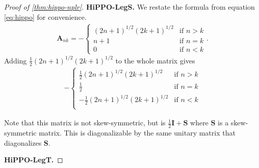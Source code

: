 \begin{proof}[Proof of \cref{thm:hippo-nplr}]
  \textbf{HiPPO-LegS.}
  We restate the formula from equation \eqref{eq:hippo} for convenience.
  \begin{align*}
    \bm{A}_{nk}
    =
    -
    \begin{cases}
      (2n+1)^{1/2}(2k+1)^{1/2} & \mbox{if } n > k \\
      n+1                      & \mbox{if } n = k \\
      0                        & \mbox{if } n < k
    \end{cases}
    .
  \end{align*}
  Adding \( \frac{1}{2}(2n+1)^{1/2}(2k+1)^{1/2} \) to the whole matrix gives
  \begin{align*}
    -
    \begin{cases}
      \frac{1}{2} (2n+1)^{1/2}(2k+1)^{1/2}  & \mbox{if } n > k \\
      \frac{1}{2}                           & \mbox{if } n = k \\
      -\frac{1}{2} (2n+1)^{1/2}(2k+1)^{1/2} & \mbox{if } n < k \\
    \end{cases}
  \end{align*}

  Note that this matrix is not skew-symmetric,
  but is \( \frac{1}{2}\bm{I} + \bm{S} \) where \( \bm{S} \) is a skew-symmetric matrix.
  This is diagonalizable by the same unitary matrix that diagonalizes \( \bm{S} \).

  \textbf{HiPPO-LegT.}


\end{proof}
